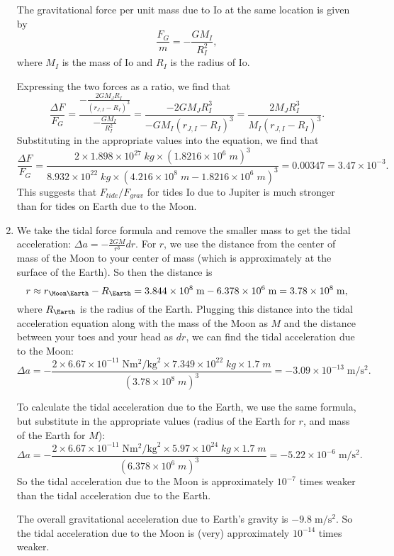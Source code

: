 \documentclass[11pt,letterpaper]{article}
\begin{document}
\begin{enumerate}[label=(\alph*)]
    The gravitational force per unit mass due to Io at the same location is given by $$\frac{F_G}{m} = -\frac{GM_I}{R_I^2},$$ where $M_I$ is the mass of Io and $R_I$ is the radius of Io. 
    
    Expressing the two forces as a ratio, we find that $$\frac{\Delta F}{F_G} = \frac{-\frac{2GM_JR_I}{(r_{J,I} - R_I)^3}}{-\frac{GM_I}{R_I^2}} = \frac{-2GM_JR_I^3}{-GM_I(r_{J,I} - R_I)^3} = \frac{2M_JR_I^3}{M_I(r_{J,I} - R_I)^3}.$$ Substituting in the appropriate values into the equation, we find that $$\frac{\Delta F}{F_G} = \frac{2\times 1.898\times 10^{27}\;\si{kg}\times (1.8216\times 10^6\;\si{m})^3}{8.932\times 10^{22}\;\si{kg}\times (4.216\times 10^8\;\si{m} - 1.8216\times 10^6\;\si{m})^3} = 0.00347 = 3.47\times 10^{-3}.$$ This suggests that $F_{tide}/F_{grav}$ for tides Io due to Jupiter is much stronger than for tides on Earth due to the Moon. 

    \item
    We take the tidal force formula and remove the smaller mass to get the tidal acceleration: $\Delta a = -\frac{2GM}{r^3}dr$. For $r$, we use the distance from the center of mass of the Moon to your center of mass (which is approximately at the surface of the Earth). So then the distance is $$r \approx r_{\Moon\Earth} - R_\Earth = 3.844\times 10^8\;\si{m} - 6.378\times 10^6\;\si{m} = 3.78\times 10^8\;\si{m},$$ where $R_\Earth$ is the radius of the Earth. Plugging this distance into the tidal acceleration equation along with the mass of the Moon as $M$ and the distance between your toes and your head as $dr$, we can find the tidal acceleration due to the Moon: $$\Delta a = -\frac{2\times 6.67\times 10^{-11}\;\si{\newton\square\meter\per\square\kilogram}\times 7.349\times 10^{22}\;\si{kg} \times 1.7\;\si{m}}{(3.78\times 10^8\;\si{m})^3} = -3.09\times 10^{-13}\;\si{\meter\per\square\second}.$$
    
    To calculate the tidal acceleration due to the Earth, we use the same formula, but substitute in the appropriate values (radius of the Earth for $r$, and mass of the Earth for $M$): $$\Delta a = -\frac{2\times 6.67\times 10^{-11}\;\si{\newton\square\meter\per\square\kilogram}\times 5.97\times 10^{24}\;\si{kg} \times 1.7\;\si{m}}{(6.378\times 10^6\;\si{m})^3} = -5.22\times 10^{-6}\;\si{\meter\per\square\second}.$$ So the tidal acceleration due to the Moon is approximately $10^{-7}$ times weaker than the tidal acceleration due to the Earth. 
    
    The overall gravitational acceleration due to Earth's gravity is $-9.8\;\si{\meter\per\square\second}.$ So the tidal acceleration due to the Moon is (very) approximately $10^{-14}$ times weaker. 
    

\end{enumerate}
\end{document}
